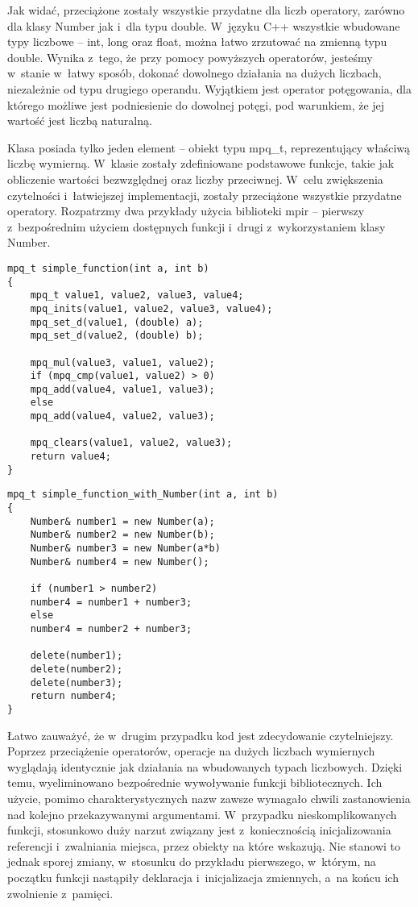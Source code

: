 Jak widać, przeciążone zostały wszystkie przydatne dla liczb operatory, zarówno dla klasy Number jak i~dla typu double. W~języku C++ wszystkie wbudowane typy liczbowe -- int, long oraz float, można łatwo zrzutować na zmienną typu double. Wynika z~tego, że przy pomocy powyższych operatorów, jesteśmy w~stanie w~łatwy sposób, dokonać dowolnego działania na dużych liczbach, niezależnie od typu drugiego operandu. Wyjątkiem jest operator potęgowania, dla którego możliwe jest podniesienie do dowolnej potęgi, pod warunkiem, że jej wartość jest liczbą naturalną.

Klasa posiada tylko jeden element – obiekt typu mpq\_t, reprezentujący właściwą liczbę wymierną. W~klasie zostały zdefiniowane podstawowe funkcje, takie jak obliczenie wartości bezwzględnej oraz liczby przeciwnej. W~celu zwiększenia czytelności i~łatwiejszej implementacji, zostały przeciążone wszystkie przydatne operatory. Rozpatrzmy dwa przykłady użycia biblioteki mpir – pierwszy z~bezpośrednim użyciem dostępnych funkcji i~drugi z~wykorzystaniem klasy Number.

\begin{lstlisting}
mpq_t simple_function(int a, int b)
{
	mpq_t value1, value2, value3, value4;
	mpq_inits(value1, value2, value3, value4);
	mpq_set_d(value1, (double) a);
	mpq_set_d(value2, (double) b);
	
	mpq_mul(value3, value1, value2);
	if (mpq_cmp(value1, value2) > 0)
	mpq_add(value4, value1, value3);
	else
	mpq_add(value4, value2, value3);
	
	mpq_clears(value1, value2, value3);
	return value4;
}
\end{lstlisting}

\begin{lstlisting}
mpq_t simple_function_with_Number(int a, int b)
{
	Number& number1 = new Number(a);
	Number& number2 = new Number(b);
	Number& number3 = new Number(a*b)
	Number& number4 = new Number();
	
	if (number1 > number2)
	number4 = number1 + number3;
	else
	number4 = number2 + number3;
	
	delete(number1);
	delete(number2);
	delete(number3);
	return number4;
}
\end{lstlisting}

Łatwo zauważyć, że w~drugim przypadku kod jest zdecydowanie czytelniejszy. Poprzez przeciążenie operatorów, operacje na dużych liczbach wymiernych wyglądają identycznie jak działania na wbudowanych typach liczbowych. Dzięki temu, wyeliminowano bezpośrednie wywoływanie funkcji bibliotecznych. Ich użycie, pomimo charakterystycznych nazw zawsze wymagało chwili zastanowienia nad kolejno przekazywanymi argumentami. W~przypadku nieskomplikowanych funkcji, stosunkowo duży narzut związany jest z~koniecznością inicjalizowania referencji i~zwalniania miejsca, przez obiekty na które wskazują. Nie stanowi to jednak sporej zmiany, w~stosunku do przykładu pierwszego, w~którym, na początku funkcji nastąpiły deklaracja i~inicjalizacja zmiennych, a~na końcu ich zwolnienie z~pamięci.

